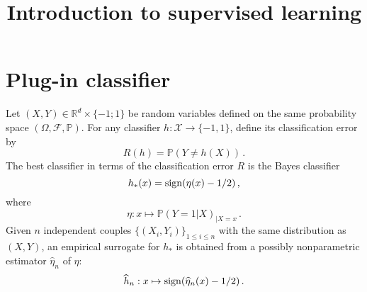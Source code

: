 \documentclass[a4paper,10pt,fleqn]{article}
\title{{\bf Introduction to supervised learning}}
\author{}
\date{}
\newcommand{\eqsp}{\,}
\newcommand{\calF}{\mathcal{F}}
\newcommand{\rset}{\ensuremath{\mathbb{R}}}
\newcommand{\bP}{\mathbb{P}}
\newcommand{\1}{\ensuremath{\mathbbm{1}}}
\begin{document}
\maketitle


\section*{Plug-in classifier}
Let $(X,Y)\in\rset^d\times\{-1;1\}$ be random variables defined on the same probability space $(\Omega,\calF,\bP)$.
For any classifier $h:\mathcal{X}\to \{-1,1\}$, define its classification error by
$$
R(h)=\bP(Y\neq h(X))\eqsp.
$$
The best classifier in terms of the classification error $R$ is the Bayes classifier
$$
h_{*}(x)={\rm sign}(\eta(x)-1/2)\eqsp,
$$
where
$$
\eta:x \mapsto\bP(Y=1|X)_{|X=x}\eqsp.
$$
Given $n$ independent couples $\{(X_i,Y_i)\}_{1\leqslant i \leqslant n}$ with the same distribution as $(X,Y)$, an empirical surrogate for $h_{*}$ is obtained from a possibly nonparametric estimator $\widehat \eta_n$ of $\eta$:
$$
\widehat h_n: x\mapsto {\rm sign}(\widehat \eta_n(x)-1/2)\eqsp.
$$
\end{document}
